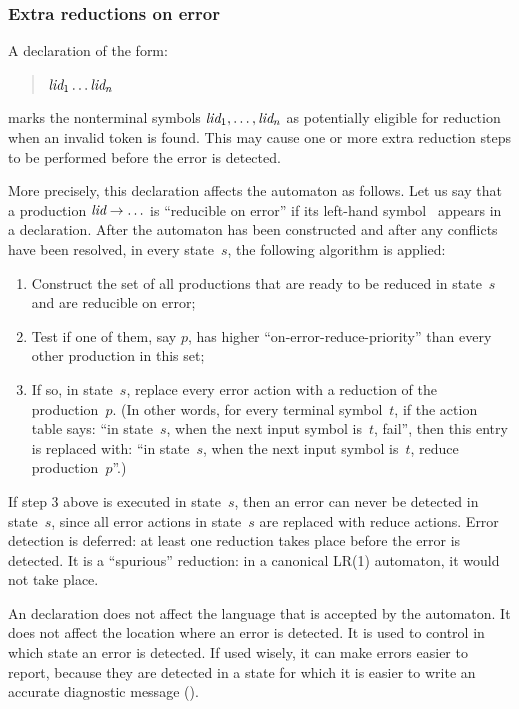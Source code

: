 \documentclass[onecolumn,11pt,nocopyrightspace,preprint]{sigplanconf}
\begin{document}
\subsubsection{Extra reductions on error}
\label{sec:onerrorreduce}

A declaration of the form:
\begin{quote}
\donerrorreduce $\textit{lid}_1 \ldots \textit{lid}_n$
\end{quote}
marks the nonterminal symbols $\textit{lid}_1, \ldots, \textit{lid}_n$ as
potentially eligible for reduction when an invalid token is found.
This may cause one or more extra reduction steps to be performed
before the error is detected.

More precisely, this declaration affects the automaton as follows. Let us say
that a production $\textit{lid} \rightarrow \ldots$ is ``reducible on error'' if
its left-hand symbol~ appears in a \donerrorreduce declaration. After
the automaton has been constructed and after any conflicts have been resolved,
in every state~$s$, the following algorithm is applied:
\begin{enumerate}
\item Construct the set of all productions that are ready to be reduced in
  state~$s$ and are reducible on error;
\item Test if one of them, say $p$, has higher ``on-error-reduce-priority''
  than every other production in this set;
\item If so, in state~$s$, replace every error action with a reduction of the
  production~$p$.
(In other words, for every terminal symbol~$t$, if the action table
says: ``in state~$s$, when the next input symbol is~$t$, fail'', then this
entry is replaced with: ``in state~$s$, when the next input symbol
is~$t$, reduce production~$p$''.)
\end{enumerate}

If step 3 above is executed in state~$s$, then an error can never be detected
in state~$s$, since all error actions in state~$s$ are replaced with reduce
actions. Error detection is deferred: at least one reduction takes place
before the error is detected. It is a ``spurious'' reduction: in a canonical
LR(1) automaton, it would not take place.

An \donerrorreduce declaration does not affect the language that is accepted
by the automaton. It does not affect the location where an error is detected.
It is used to control in which state an error is detected. If used wisely, it
can make errors easier to report, because they are detected in a state for
which it is easier to write an accurate diagnostic message
().
\end{document}
